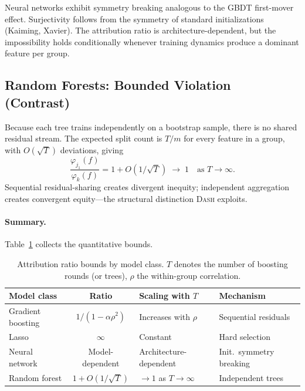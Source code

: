 \documentclass{jmlr}
\newcommand{\DASH}{\textsc{Dash}}
\newcommand{\GBDT}{\textsc{GBDT}}
\begin{document}
Neural networks exhibit symmetry breaking analogous to the \GBDT{} first-mover effect. Surjectivity follows from the symmetry of standard initializations (Kaiming, Xavier). The attribution ratio is architecture-dependent, but the impossibility holds conditionally whenever training dynamics produce a dominant feature per group.

\subsection{Random Forests: Bounded Violation (Contrast)}
\label{sec:rf}

Because each tree trains independently on a bootstrap sample, there is no shared residual stream. The expected split count is $T/m$ for every feature in a group, with $O(\sqrt{T})$ deviations, giving
\[
    \frac{\varphi_{j_1}(f)}{\varphi_k(f)} = 1 + O(1/\sqrt{T}) \;\to\; 1 \quad \text{as } T \to \infty.
\]
Sequential residual-sharing creates divergent inequity; independent aggregation creates convergent equity---the structural distinction \DASH{} exploits.

\paragraph{Summary.}
Table~\ref{tab:model-comparison} collects the quantitative bounds.

\begin{table}[t]
\centering
\caption{Attribution ratio bounds by model class. $T$ denotes the number of boosting rounds (or trees), $\rho$ the within-group correlation.}
\label{tab:model-comparison}
\small
\begin{tabular}{@{}lcll@{}}
\toprule
Model class & Ratio & Scaling with $T$ & Mechanism \\
\midrule
Gradient boosting & $1/(1-\alpha\rho^2)$ & Increases with $\rho$ & Sequential residuals \\
Lasso & $\infty$ & Constant & Hard selection \\
Neural network & Model-dependent & Architecture-dependent & Init.\ symmetry breaking \\
Random forest\footnotemark & $1 + O(1/\sqrt{T})$ & $\to 1$ as $T \to \infty$ & Independent trees \\
\bottomrule
\end{tabular}
\end{table}
\end{document}
